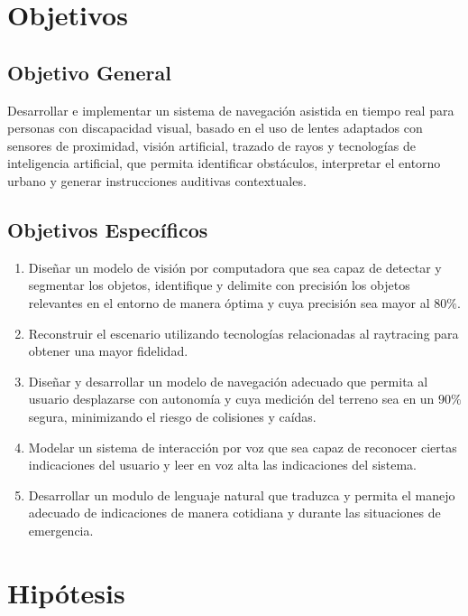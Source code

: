 \section{Objetivos}


\subsection{Objetivo General}

Desarrollar e implementar un sistema de navegación asistida en tiempo real para personas con discapacidad visual, basado en el uso de lentes adaptados con sensores de proximidad, visión artificial, trazado de rayos y tecnologías de inteligencia artificial, que permita identificar obstáculos, interpretar el entorno urbano y generar instrucciones auditivas contextuales. 

\subsection{Objetivos Específicos}

\begin{enumerate}
    
    \item Diseñar un modelo de visión por computadora que sea capaz de detectar y segmentar los objetos, identifique y delimite con precisión los objetos relevantes en el entorno de manera óptima y cuya precisión sea mayor 
al $80\%$.
    
    \item Reconstruir el escenario utilizando tecnologías relacionadas al raytracing para obtener una mayor fidelidad.
    
    \item Diseñar y desarrollar un modelo de navegación adecuado que permita al usuario desplazarse con autonomía y cuya medición del terreno sea en un $90\%$ segura, minimizando el riesgo de colisiones y caídas.  

    \item Modelar un sistema de interacción por voz que sea capaz de reconocer ciertas indicaciones del usuario y leer en voz alta las indicaciones del sistema.
    
    \item Desarrollar un modulo de lenguaje natural que traduzca y permita el manejo adecuado de indicaciones de manera cotidiana y durante las situaciones de emergencia.
\end{enumerate}

\section{Hipótesis}


